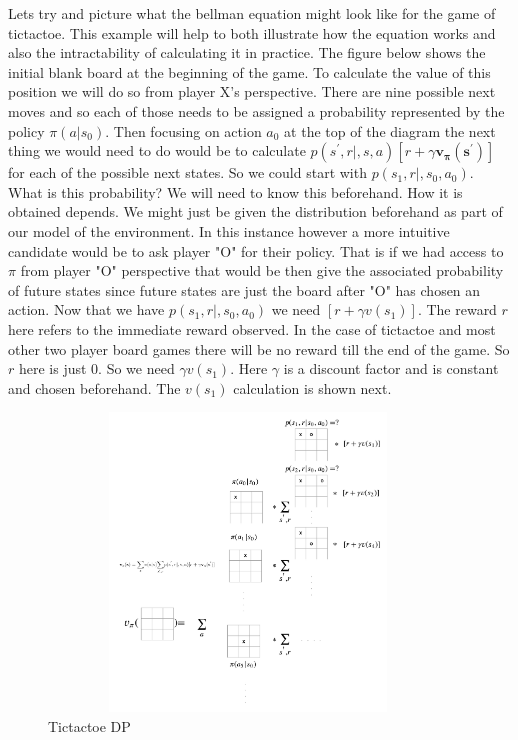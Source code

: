 Lets try and picture what the bellman equation might look like for the game of tictactoe. This example will help to both illustrate how the equation works and also the intractability of calculating it in practice. The figure below shows the initial blank board at the beginning of the game. To calculate the value of this position we will do so from player X's perspective. There are nine possible next moves and so each of those needs to be assigned a probability represented by the policy $\pi(a | s_{0})$. Then focusing on action $a_{0}$ at the top of the diagram the next thing we would need to do would be to calculate $p(s^{'},r|,s,a)[ r + \gamma \mathbf{v_{\pi}(s^{'})}]$ for each of the possible next states. So we could start with $p(s_{1},r|,s_{0},a_{0})$. What is this probability? We will need to know this beforehand. How it is obtained depends. We might just be given the distribution beforehand as part of our model of the environment. In this instance however a more intuitive candidate would be to ask player "O" for their policy. That is if we had access to $\pi$ from player "O" perspective that would be then give the associated probability of future states since future states are just the board after "O" has chosen an action. Now that we have $p(s_{1},r|,s_{0},a_{0})$ we need $[r + \gamma v(s_{1})]$. The reward $r$ here refers to the immediate reward observed. In the case of tictactoe and most other two player board games there will be no reward till the end of the game. So $r$ here is just 0. So we need $\gamma v(s_{1})$. Here $\gamma$ is a discount factor and is constant and chosen beforehand. The $v(s_{1})$ calculation is shown next. 

\begin{figure}[H]
        \centering
        \includegraphics[width=400px,height=300px]{images/PolicyEvaluationExample/intractable_value_function.png}
        \caption{Tictactoe DP}
        \label{fig:tictactoe-dp}
\end{figure}

